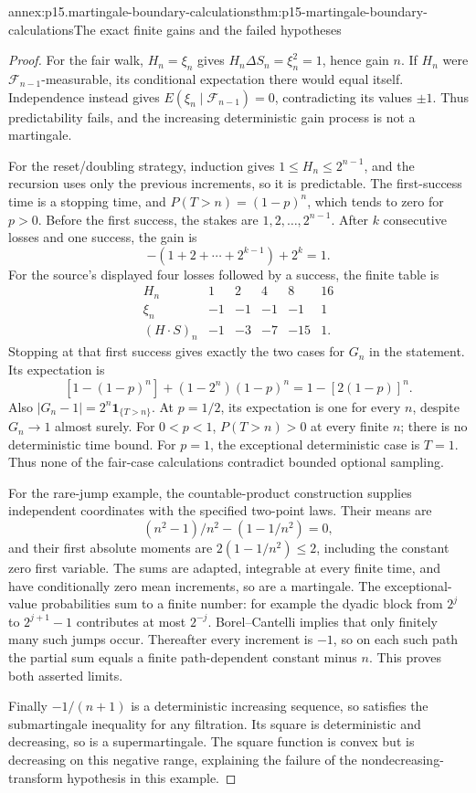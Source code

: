 \begin{annexitem}{annex:p15.martingale-boundary-calculations}{thm:p15-martingale-boundary-calculations}{The exact finite gains and the failed hypotheses}
\begin{proof}
For the fair walk, \(H_n=\xi_n\) gives
\(H_n\Delta S_n=\xi_n^2=1\), hence gain \(n\).
If \(H_n\) were \(\mathcal F_{n-1}\)-measurable, its
conditional expectation there would equal itself.
Independence instead gives \(E(\xi_n\mid\mathcal F_{n-1})=0\),
contradicting its values \(\pm1\).
Thus predictability fails, and the increasing deterministic
gain process is not a martingale.

For the reset/doubling strategy, induction gives
\(1\leq H_n\leq2^{n-1}\), and the recursion uses only
the previous increments, so it is predictable.
The first-success time is a stopping time, and
\(P(T>n)=(1-p)^n\), which tends to zero for \(p>0\).
Before the first success, the stakes are \(1,2,\ldots,2^{n-1}\).
After \(k\) consecutive losses and one success, the gain is
\[
                    -(1+2+\cdots+2^{k-1})+2^k=1.
\]
For the source's displayed four losses followed by a success,
the finite table is
\[
 \begin{array}{c|rrrrr}
 H_n&1&2&4&8&16\\
 \xi_n&-1&-1&-1&-1&1\\
 (H\cdot S)_n&-1&-3&-7&-15&1 .
 \end{array}
\]
Stopping at that first success gives exactly the two cases
for \(G_n\) in the statement. Its expectation is
\[
        [1-(1-p)^n]+(1-2^n)(1-p)^n=1-[2(1-p)]^n.
\]
Also \(|G_n-1|=2^n\mathbf1_{\{T>n\}}\).
At \(p=1/2\), its expectation is one for every \(n\),
despite \(G_n\to1\) almost surely.
For \(0<p<1\), \(P(T>n)>0\) at every finite \(n\);
there is no deterministic time bound. For \(p=1\),
the exceptional deterministic case is \(T=1\).
Thus none of the fair-case calculations contradict bounded
optional sampling.

For the rare-jump example, the countable-product construction
supplies independent coordinates with the specified two-point laws.
Their means are
\[
                 (n^2-1)/n^2-(1-1/n^2)=0,
\]
and their first absolute moments are
\(2(1-1/n^2)\leq2\), including the constant zero first variable.
The sums are adapted, integrable at every finite time, and
have conditionally zero mean increments, so are a martingale.
The exceptional-value probabilities sum to a finite number:
for example the dyadic block from \(2^j\) to \(2^{j+1}-1\)
contributes at most \(2^{-j}\).
Borel--Cantelli implies that only finitely many such jumps occur.
Thereafter every increment is \(-1\), so on each such path
the partial sum equals a finite path-dependent constant minus \(n\).
This proves both asserted limits.

Finally \(-1/(n+1)\) is a deterministic increasing sequence,
so satisfies the submartingale inequality for any filtration.
Its square is deterministic and decreasing, so is a
supermartingale. The square function is convex but is
decreasing on this negative range, explaining the failure
of the nondecreasing-transform hypothesis in this example.
\end{proof}
\end{annexitem}
